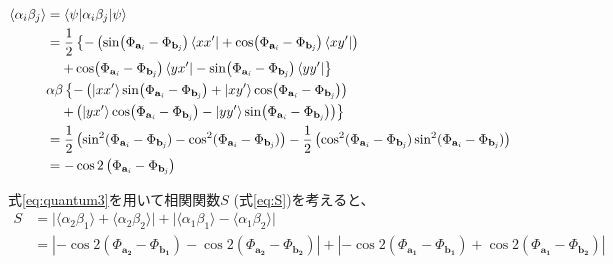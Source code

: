 \documentclass[../../main.tex]{subfiles}
\numberwithin{equation}{section}
\numberwithin{table}{section}
\numberwithin{figure}{section}
\begin{document}
\begin{align}
  \langle \alpha_i\beta_j \rangle
  &= \langle \psi | \alpha_i \beta_j | \psi \rangle \nonumber \\
  &= \frac{1}{2} \left\{ -\left( \sin(\Phi_{\mathbf{a}_{\mathit{i}}}-\Phi_{\mathbf{b}_{\mathit{j}}}) \bra{xx'} + \cos(\Phi_{\mathbf{a}_{\mathit{i}}}-\Phi_{\mathbf{b}_{\mathit{j}}}) \bra{xy'} \right) \right. \nonumber \\
  & \quad \left. + \cos(\Phi_{\mathbf{a}_{\mathit{i}}}-\Phi_{\mathbf{b}_{\mathit{j}}}) \bra{yx'} - \sin(\Phi_{\mathbf{a}_{\mathit{i}}}-\Phi_{\mathbf{b}_{\mathit{j}}}) \bra{yy'} \right\} \nonumber \\
  &\alpha\beta \left\{ -\left( \ket{xx'} \sin(\Phi_{\mathbf{a}_{\mathit{i}}}-\Phi_{\mathbf{b}_{\mathit{j}}}) + \ket{xy'} \cos(\Phi_{\mathbf{a}_{\mathit{i}}}-\Phi_{\mathbf{b}_{\mathit{j}}}) \right) \right. \nonumber \\
  & \quad \left. + \left( \ket{yx'} \cos(\Phi_{\mathbf{a}_{\mathit{i}}}-\Phi_{\mathbf{b}_{\mathit{j}}}) - \ket{yy'} \sin(\Phi_{\mathbf{a}_{\mathit{i}}}-\Phi_{\mathbf{b}_{\mathit{j}}}) \right) \right\}\nonumber \\
  &= \frac{1}{2} \left( \sin^2 (\Phi_{\mathbf{a}_{\mathit{i}}}-\Phi_{\mathbf{b}_{\mathit{j}}}) - \cos^2 (\Phi_{\mathbf{a}_{\mathit{i}}}-\Phi_{\mathbf{b}_{\mathit{j}}}) \right) - \frac{1}{2} \left( \cos^2 (\Phi_{\mathbf{a}_{\mathit{i}}}-\Phi_{\mathbf{b}_{\mathit{j}}}) \sin^2 (\Phi_{\mathbf{a}_{\mathit{i}}}-\Phi_{\mathbf{b}_{\mathit{j}}}) \right)\nonumber \\
  &= - \cos2 \left(\Phi_{\mathbf{a}_{\mathit{i}}}-\Phi_{\mathbf{b}_{\mathit{j}}} \right)\label{eq:quantum3}
\end{align}

式\eqref{eq:quantum3}を用いて相関関数$S$ (式\eqref{eq:S})を考えると、
\begin{align}
  S &= \lvert \langle \alpha_2\beta_1 \rangle + \langle \alpha_2\beta_2 \rangle \rvert + \lvert \langle \alpha_1\beta_1 \rangle - \langle \alpha_1\beta_2 \rangle \rvert \nonumber\\
  &= \left| - \cos2 \left(\Phi_{\mathbf{a_2}} - \Phi_{\mathbf{b_1}} \right) - \cos2 \left(\Phi_{\mathbf{a_2}} - \Phi_{\mathbf{b_2}} \right) \right| +\left| - \cos2 \left(\Phi_{\mathbf{a_1}} - \Phi_{\mathbf{b_1}} \right) + \cos2 \left(\Phi_{\mathbf{a_1}} - \Phi_{\mathbf{b_2}} \right) \right|\label{eq:quantum4}
\end{align}
\end{document}
